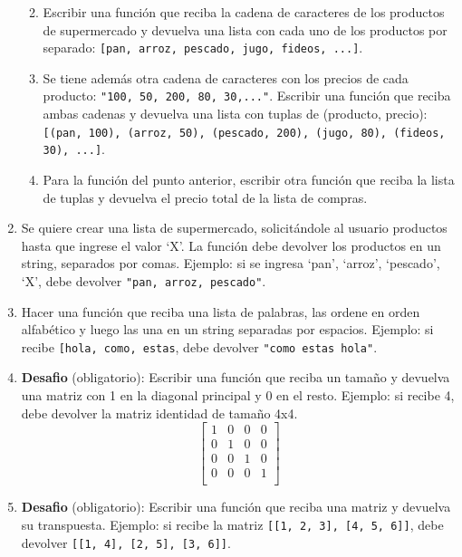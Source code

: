 \documentclass[
  letterpaper,
  DIV=11,
  numbers=noendperiod]{scrreprt}
\begin{document}
\begin{enumerate}
  \begin{enumerate}
  \def\labelenumii{\alph{enumii}.}
  \item
    Escribir una función que reciba la cadena de caracteres de los
    productos de supermercado y devuelva una lista con cada uno de los
    productos por separado:
    \texttt{{[}\textquotesingle{}pan\textquotesingle{},\ \textquotesingle{}arroz\textquotesingle{},\ \textquotesingle{}pescado\textquotesingle{},\ \textquotesingle{}jugo\textquotesingle{},\ \textquotesingle{}fideos\textquotesingle{},\ ...{]}}.
  \item
    Se tiene además otra cadena de caracteres con los precios de cada
    producto: \texttt{"100,\ 50,\ 200,\ 80,\ 30,..."}. Escribir una
    función que reciba ambas cadenas y devuelva una lista con tuplas de
    (producto, precio):
    \texttt{{[}(\textquotesingle{}pan\textquotesingle{},\ 100),\ (\textquotesingle{}arroz\textquotesingle{},\ 50),\ (\textquotesingle{}pescado\textquotesingle{},\ 200),\ (\textquotesingle{}jugo\textquotesingle{},\ 80),\ (\textquotesingle{}fideos\textquotesingle{},\ 30),\ ...{]}}.
  \item
    Para la función del punto anterior, escribir otra función que reciba
    la lista de tuplas y devuelva el precio total de la lista de
    compras.
  \end{enumerate}
\item
  Se quiere crear una lista de supermercado, solicitándole al usuario
  productos hasta que ingrese el valor `X'. La función debe devolver los
  productos en un string, separados por comas. Ejemplo: si se ingresa
  `pan', `arroz', `pescado', `X', debe devolver
  \texttt{"pan,\ arroz,\ pescado"}.
\item
  Hacer una función que reciba una lista de palabras, las ordene en
  orden alfabético y luego las una en un string separadas por espacios.
  Ejemplo: si recibe
  \texttt{{[}\textquotesingle{}hola\textquotesingle{},\ \textquotesingle{}como\textquotesingle{},\ \textquotesingle{}estas\textquotesingle{}{]}},
  debe devolver \texttt{"como\ estas\ hola"}.
\item
  \textbf{Desafio} (obligatorio): Escribir una función que reciba un
  tamaño y devuelva una matriz con 1 en la diagonal principal y 0 en el
  resto. Ejemplo: si recibe 4, debe devolver la matriz identidad de
  tamaño 4x4. \[
  \begin{bmatrix}
  1 & 0 & 0 & 0 \\
  0 & 1 & 0 & 0 \\
  0 & 0 & 1 & 0 \\
  0 & 0 & 0 & 1 \\
  \end{bmatrix}
  \]
\item
  \textbf{Desafio} (obligatorio): Escribir una función que reciba una
  matriz y devuelva su transpuesta. Ejemplo: si recibe la matriz
  \texttt{{[}{[}1,\ 2,\ 3{]},\ {[}4,\ 5,\ 6{]}{]}}, debe devolver
  \texttt{{[}{[}1,\ 4{]},\ {[}2,\ 5{]},\ {[}3,\ 6{]}{]}}.


\end{enumerate}
\end{document}

